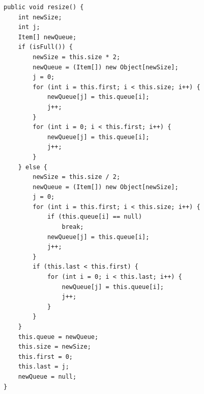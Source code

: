 \documentclass[a4paper,11pt]{article}
\newenvironment{code}{\captionsetup{type=listing}}{}
\begin{document}
\begin{code}
    \label{code:resize}
    \begin{verbatim}
public void resize() {
    int newSize;
    int j;
    Item[] newQueue;
    if (isFull()) {
        newSize = this.size * 2;
        newQueue = (Item[]) new Object[newSize];
        j = 0;
        for (int i = this.first; i < this.size; i++) {
            newQueue[j] = this.queue[i];
            j++;
        }
        for (int i = 0; i < this.first; i++) {
            newQueue[j] = this.queue[i];
            j++;
        }
    } else {
        newSize = this.size / 2;
        newQueue = (Item[]) new Object[newSize];
        j = 0;
        for (int i = this.first; i < this.size; i++) {
            if (this.queue[i] == null)
                break;
            newQueue[j] = this.queue[i];
            j++;
        }
        if (this.last < this.first) {
            for (int i = 0; i < this.last; i++) {
                newQueue[j] = this.queue[i];
                j++;
            }
        }
    }
    this.queue = newQueue;
    this.size = newSize;
    this.first = 0;
    this.last = j;
    newQueue = null;
}
\end{verbatim}
\end{code}
\end{document}
